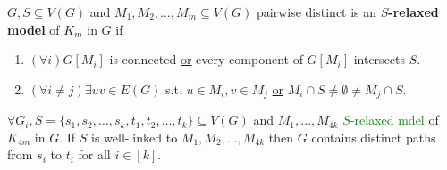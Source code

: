 \begin{defn}
	$G, S \subseteq V(G)$ and $M_{1}, M_{2}, \dots, M_{m} \subseteq V(G)$ pairwise distinct is an \textbf{$S$-relaxed model} of $K_{m}$ in $G$ if
	
	\begin{enumerate}
		\item $(\forall i) G[M_{i}]$ is connected \underline{or} every component of $G[M_{i}]$ intersects $S$.
		\item $(\forall i \neq j) \exists uv \in E(G)$ s.t. $u \in M_{i}, v \in M_{j}$ \underline{or} $M_{i} \cap S \neq \emptyset \neq M_{j} \cap S$.
	\end{enumerate}
\end{defn}

\begin{thm}[\textcolor{Green}{Slightly changed}]
	$\forall G_{i}, S = \{s_{1}, s_{2}, \dots, s_{k}, t_{1}, t_{2}, \dots, t_{k}\} \subseteq V(G)$ and $M_{1}, \dots, M_{4k}$ \textcolor{Green}{$S$-relaxed mdel} of $K_{4m}$ in $G$. If $S$  is well-linked to $M_{1}, M_{2}, \dots, M_{4k}$ then $G$ contains distinct paths from $s_{i}$ to $t_{i}$ for all $i \in [k]$.
\end{thm}

